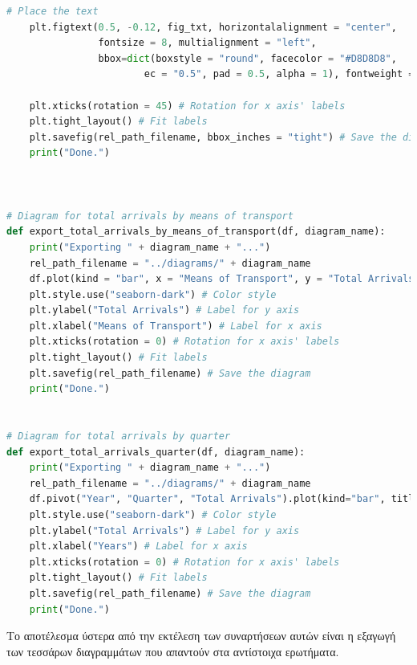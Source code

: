 \documentclass[a4paper]{article}
\begin{document}
\begin{lstlisting}[language=Python, caption=diagram.py]
    # Place the text
    plt.figtext(0.5, -0.12, fig_txt, horizontalalignment = "center",
                fontsize = 8, multialignment = "left",
                bbox=dict(boxstyle = "round", facecolor = "#D8D8D8",
                        ec = "0.5", pad = 0.5, alpha = 1), fontweight = "bold")

    plt.xticks(rotation = 45) # Rotation for x axis' labels
    plt.tight_layout() # Fit labels
    plt.savefig(rel_path_filename, bbox_inches = "tight") # Save the diagram
    print("Done.")



# Diagram for total arrivals by means of transport
def export_total_arrivals_by_means_of_transport(df, diagram_name):
    print("Exporting " + diagram_name + "...")
    rel_path_filename = "../diagrams/" + diagram_name
    df.plot(kind = "bar", x = "Means of Transport", y = "Total Arrivals", title = "Total Arrivals by Means of Transport in 2011-2014", legend = False) # Plotting the dataframe
    plt.style.use("seaborn-dark") # Color style
    plt.ylabel("Total Arrivals") # Label for y axis
    plt.xlabel("Means of Transport") # Label for x axis
    plt.xticks(rotation = 0) # Rotation for x axis' labels
    plt.tight_layout() # Fit labels
    plt.savefig(rel_path_filename) # Save the diagram
    print("Done.")


# Diagram for total arrivals by quarter
def export_total_arrivals_quarter(df, diagram_name):
    print("Exporting " + diagram_name + "...")
    rel_path_filename = "../diagrams/" + diagram_name
    df.pivot("Year", "Quarter", "Total Arrivals").plot(kind="bar", title = "Total Arrivals by Quarter in 2011-2014") # Plotting the dataframe
    plt.style.use("seaborn-dark") # Color style
    plt.ylabel("Total Arrivals") # Label for y axis
    plt.xlabel("Years") # Label for x axis
    plt.xticks(rotation = 0) # Rotation for x axis' labels
    plt.tight_layout() # Fit labels
    plt.savefig(rel_path_filename) # Save the diagram
    print("Done.")

\end{lstlisting}


Το αποτέλεσμα ύστερα από την εκτέλεση των συναρτήσεων αυτών είναι η εξαγωγή των τεσσάρων διαγραμμάτων που απαντούν στα αντίστοιχα ερωτήματα.
\end{document}
